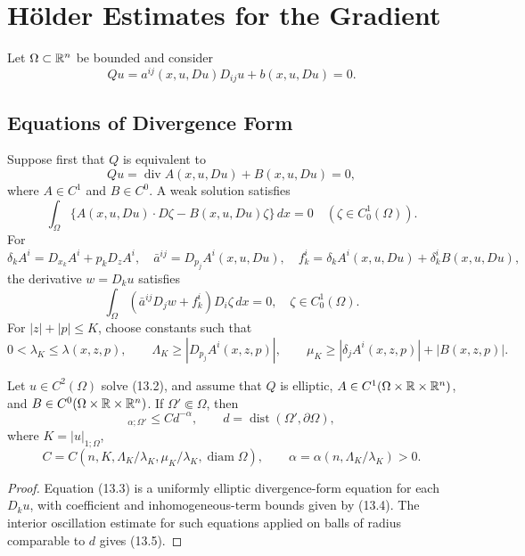 \chapter{H\"older Estimates for the Gradient}

Let $\Omega\subset\mathbb{R}^n$ be bounded and consider
\begin{equation}
Qu=a^{ij}(x,u,Du)D_{ij}u+b(x,u,Du)=0.
\tag{13.1}
\end{equation}

\section{Equations of Divergence Form}

Suppose first that $Q$ is equivalent to
\begin{equation}
Qu=\operatorname{div}A(x,u,Du)+B(x,u,Du)=0,
\tag{13.2}
\end{equation}
where $A\in C^1$ and $B\in C^0$.  A weak solution satisfies
\[
\int_\Omega\{A(x,u,Du)\cdot D\zeta-B(x,u,Du)\zeta\}\,dx=0
\quad(\zeta\in C_0^1(\Omega)).
\]
For
\[
\delta_k A^i=D_{x_k}A^i+p_kD_zA^i,
\quad
\bar a^{ij}=D_{p_j}A^i(x,u,Du),
\quad
f_k^i=\delta_kA^i(x,u,Du)+\delta_k^iB(x,u,Du),
\]
the derivative $w=D_ku$ satisfies
\begin{equation}
\int_\Omega(\bar a^{ij}D_jw+f_k^i)D_i\zeta\,dx=0,
\quad \zeta\in C_0^1(\Omega).
\tag{13.3}
\end{equation}
For $|z|+|p|\le K$, choose constants such that
\begin{equation}
0<\lambda_K\le\lambda(x,z,p),\qquad
\Lambda_K\ge |D_{p_j}A^i(x,z,p)|,
\qquad
\mu_K\ge |\delta_jA^i(x,z,p)|+|B(x,z,p)|.
\tag{13.4}
\end{equation}

\begin{theorem}
\label{thm:gt13-holder-gradient-13-1}
Let $u\in C^2(\Omega)$ solve \textup{(13.2)}, and assume that $Q$ is elliptic,
$A\in C^1(\Omega\times\mathbb{R}\times\mathbb{R}^n)$, and
$B\in C^0(\Omega\times\mathbb{R}\times\mathbb{R}^n)$.  If $\Omega'\Subset\Omega$, then
\begin{equation}
[Du]_{\alpha;\Omega'}\le Cd^{-\alpha},
\qquad d=\operatorname{dist}(\Omega',\partial\Omega),
\tag{13.5}
\end{equation}
where $K=|u|_{1;\Omega}$,
\[
C=C(n,K,\Lambda_K/\lambda_K,\mu_K/\lambda_K,
\operatorname{diam}\Omega),
\qquad
\alpha=\alpha(n,\Lambda_K/\lambda_K)>0.
\]
\end{theorem}
\begin{proof}
\sketch Equation \textup{(13.3)} is a uniformly elliptic divergence-form
equation for each $D_ku$, with coefficient and inhomogeneous-term bounds
given by \textup{(13.4)}.  The interior oscillation estimate for such equations
applied on balls of radius comparable to $d$ gives \textup{(13.5)}.
\end{proof}

